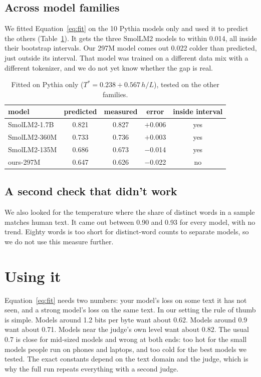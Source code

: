 \documentclass[10pt]{article}
\newcommand{\Ts}{T^{*}}
\begin{document}
\subsection{Across model families}

We fitted Equation~\ref{eq:fit} on the 10 Pythia models only and used it to predict the others (Table~\ref{tab:transfer}). It gets the three SmolLM2 models to within 0.014, all inside their bootstrap intervals. Our 297M model comes out 0.022 colder than predicted, just outside its interval. That model was trained on a different data mix with a different tokenizer, and we do not yet know whether the gap is real.

\begin{table}[t]
\centering
\small
\begin{tabular}{lcccc}
\toprule
model & predicted & measured & error & inside interval \\
\midrule
SmolLM2-1.7B & 0.821 & 0.827 & $+$0.006 & yes \\
SmolLM2-360M & 0.733 & 0.736 & $+$0.003 & yes \\
SmolLM2-135M & 0.686 & 0.673 & $-$0.014 & yes \\
ours-297M & 0.647 & 0.626 & $-$0.022 & no \\
\bottomrule
\end{tabular}
\caption{Fitted on Pythia only ($\Ts = 0.238 + 0.567\,h/L$), tested on the other families.}
\label{tab:transfer}
\end{table}

\subsection{A second check that didn't work}

We also looked for the temperature where the share of distinct words in a sample matches human text. It came out between 0.90 and 0.93 for every model, with no trend. Eighty words is too short for distinct-word counts to separate models, so we do not use this measure further.

\section{Using it}
\label{sec:using}

Equation~\ref{eq:fit} needs two numbers: your model's loss on some text it has not seen, and a strong model's loss on the same text. In our setting the rule of thumb is simple. Models around 1.2 bits per byte want about 0.62. Models around 0.9 want about 0.71. Models near the judge's own level want about 0.82. The usual 0.7 is close for mid-sized models and wrong at both ends: too hot for the small models people run on phones and laptops, and too cold for the best models we tested. The exact constants depend on the text domain and the judge, which is why the full run repeats everything with a second judge.
\end{document}
